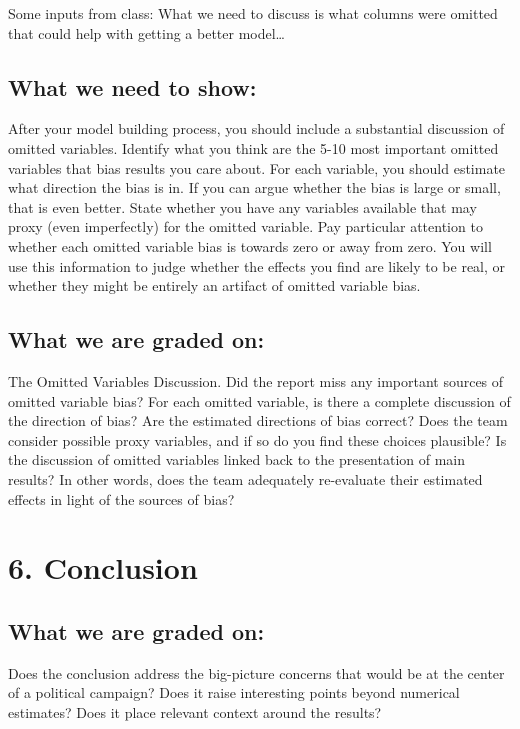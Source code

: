 \documentclass[]{article}
\begin{document}
Some inputs from class: What we need to discuss is what columns were
omitted that could help with getting a better model\ldots{}

\subsection{What we need to show:}\label{what-we-need-to-show-1}

After your model building process, you should include a substantial
discussion of omitted variables. Identify what you think are the 5-10
most important omitted variables that bias results you care about. For
each variable, you should estimate what direction the bias is in. If you
can argue whether the bias is large or small, that is even better. State
whether you have any variables available that may proxy (even
imperfectly) for the omitted variable. Pay particular attention to
whether each omitted variable bias is towards zero or away from zero.
You will use this information to judge whether the effects you find are
likely to be real, or whether they might be entirely an artifact of
omitted variable bias.

\subsection{What we are graded on:}\label{what-we-are-graded-on-4}

The Omitted Variables Discussion. Did the report miss any important
sources of omitted variable bias? For each omitted variable, is there a
complete discussion of the direction of bias? Are the estimated
directions of bias correct? Does the team consider possible proxy
variables, and if so do you find these choices plausible? Is the
discussion of omitted variables linked back to the presentation of main
results? In other words, does the team adequately re-evaluate their
estimated effects in light of the sources of bias?

\section{6. Conclusion}\label{conclusion}

\subsection{What we are graded on:}\label{what-we-are-graded-on-5}

Does the conclusion address the big-picture concerns that would be at
the center of a political campaign? Does it raise interesting points
beyond numerical estimates? Does it place relevant context around the
results?
\end{document}
